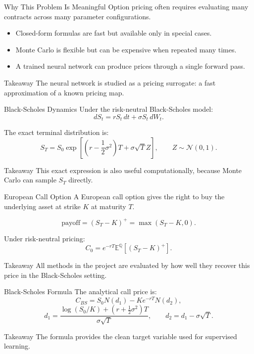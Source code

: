 \documentclass[10pt,aspectratio=43]{beamer}
\newcommand{\takeaway}[1]{%
    \begin{block}{Takeaway}
        #1
    \end{block}
}
\begin{document}
\begin{frame}{Why This Problem Is Meaningful}
    Option pricing often requires evaluating many contracts across many parameter configurations.

    \begin{itemize}
        \item Closed-form formulas are fast but available only in special cases.
        \item Monte Carlo is flexible but can be expensive when repeated many times.
        \item A trained neural network can produce prices through a single forward pass.
    \end{itemize}

    \vspace{0.2em}
    \takeaway{The neural network is studied as a pricing surrogate: a fast approximation of a known pricing map.}
\end{frame}

\begin{frame}{Black-Scholes Dynamics}
    Under the risk-neutral Black-Scholes model:
    \[
        dS_t = rS_t\,dt + \sigma S_t\,dW_t.
    \]

    The exact terminal distribution is:
    \[
        S_T =
        S_0\exp\left[
            \left(r-\frac{1}{2}\sigma^2\right)T
            +\sigma\sqrt{T}Z
            \right],
        \qquad Z\sim\mathcal{N}(0,1).
    \]

    \takeaway{This exact expression is also useful computationally, because Monte Carlo can sample \(S_T\) directly.}
\end{frame}

\begin{frame}{European Call Option}
    A European call option gives the right to buy the underlying asset at strike \(K\) at maturity \(T\).

    \[
        \text{payoff} = (S_T-K)^+ = \max(S_T-K,0).
    \]

    Under risk-neutral pricing:
    \[
        C_0 = e^{-rT}\mathbb{E}^{\mathbb{Q}}\left[(S_T-K)^+\right].
    \]

    \takeaway{All methods in the project are evaluated by how well they recover this price in the Black-Scholes setting.}
\end{frame}

\begin{frame}{Black-Scholes Formula}
    The analytical call price is:
    \[
        C_{BS}
        =
        S_0N(d_1)
        -
        Ke^{-rT}N(d_2),
    \]
    \[
        d_1 =
        \frac{\log(S_0/K)+(r+\frac{1}{2}\sigma^2)T}{\sigma\sqrt{T}},
        \qquad
        d_2=d_1-\sigma\sqrt{T}.
    \]

    \takeaway{The formula provides the clean target variable used for supervised learning.}
\end{frame}
\end{document}
